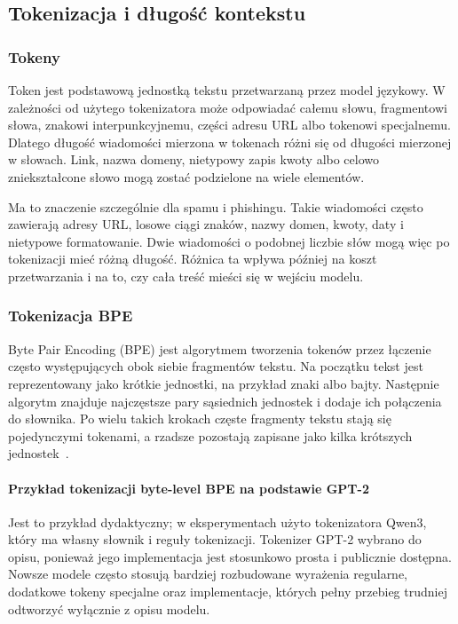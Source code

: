 \subsection{Tokenizacja i długość kontekstu}

\subsubsection{Tokeny}

Token jest podstawową jednostką tekstu przetwarzaną przez model językowy. W
zależności od użytego tokenizatora może odpowiadać całemu słowu, fragmentowi
słowa, znakowi interpunkcyjnemu, części adresu URL albo tokenowi specjalnemu.
Dlatego długość wiadomości mierzona w tokenach różni się od długości mierzonej w
słowach. Link, nazwa domeny, nietypowy zapis kwoty albo celowo zniekształcone
słowo mogą zostać podzielone na wiele elementów.

Ma to znaczenie szczególnie dla spamu i phishingu. Takie wiadomości często
zawierają adresy URL, losowe ciągi znaków, nazwy domen, kwoty, daty i nietypowe
formatowanie. Dwie wiadomości o podobnej liczbie słów mogą więc po tokenizacji
mieć różną długość. Różnica ta wpływa później na koszt przetwarzania i na to,
czy cała treść mieści się w wejściu modelu.

\subsubsection{Tokenizacja BPE}

Byte Pair Encoding (BPE) jest algorytmem tworzenia tokenów przez łączenie
często występujących obok siebie fragmentów tekstu. Na początku tekst jest
reprezentowany jako krótkie jednostki, na przykład znaki albo bajty. Następnie
algorytm znajduje najczęstsze pary sąsiednich jednostek i dodaje ich połączenia
do słownika. Po wielu takich krokach częste fragmenty tekstu stają się
pojedynczymi tokenami, a rzadsze pozostają zapisane jako kilka krótszych
jednostek~\autocite{sennrich-subword-2016}.

\paragraph{Przykład tokenizacji byte-level BPE na podstawie GPT-2}

Jest to przykład dydaktyczny; w eksperymentach użyto tokenizatora Qwen3, który
ma własny słownik i reguły tokenizacji. Tokenizer GPT-2 wybrano do opisu,
ponieważ jego implementacja jest stosunkowo prosta i publicznie dostępna.
Nowsze modele często stosują bardziej rozbudowane wyrażenia regularne,
dodatkowe tokeny specjalne oraz implementacje, których pełny przebieg trudniej
odtworzyć wyłącznie z opisu modelu.

